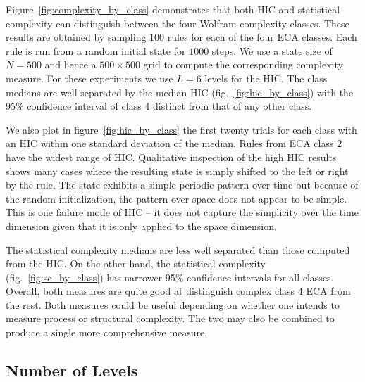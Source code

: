 Figure~\ref{fig:complexity_by_class} demonstrates that both HIC and statistical
complexity can distinguish between the four Wolfram complexity classes. These
results are obtained by sampling $100$ rules for each of the four ECA classes.
Each rule is run from a random initial state for $1000$ steps. We use a state
size of $N\!=\!500$ and hence a $500 \times 500$ grid to compute the
corresponding complexity measure. For these experiments we use $L=6$ levels for
the HIC. The class medians are well separated by the median HIC
(fig.~\ref{fig:hic_by_class}) with the 95\% confidence interval of class 4
distinct from that of any other class.

We also plot in figure~\ref{fig:hic_by_class} the first twenty trials for each
class with an HIC within one standard deviation of the median. Rules from ECA
class 2 have the widest range of HIC. Qualitative inspection of the high HIC
results shows many cases where the resulting state is simply shifted to the
left or right by the rule. The state exhibits a simple periodic pattern over
time but because of the random initialization, the pattern over space does not
appear to be simple. This is one failure mode of HIC -- it does not
capture the simplicity over the time dimension given that it is only applied to
the space dimension.

The statistical complexity medians are less well separated than those computed
from the HIC. On the other hand, the statistical complexity
(fig.~\ref{fig:sc_by_class}) has narrower 95\% confidence intervals for all
classes. Overall, both measures are quite good at distinguish complex class 4
ECA from the rest. Both measures could be useful depending on whether one
intends to measure process or structural complexity. The two may also be
combined to produce a single more comprehensive measure.

\subsection{Number of Levels}


